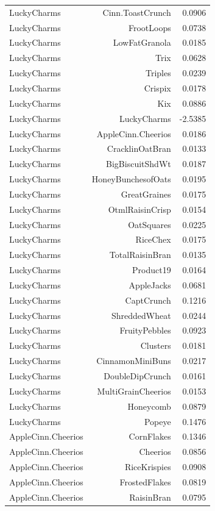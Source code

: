 \begin{longtable}{@{}lrr@{}}
LuckyCharms & Cinn.ToastCrunch & 0.0906 \\
LuckyCharms & FrootLoops & 0.0738 \\
LuckyCharms & LowFatGranola & 0.0185 \\
LuckyCharms & Trix & 0.0628 \\
LuckyCharms & Triples & 0.0239 \\
LuckyCharms & Crispix & 0.0178 \\
LuckyCharms & Kix & 0.0886 \\
LuckyCharms & LuckyCharms & -2.5385 \\
LuckyCharms & AppleCinn.Cheerios & 0.0186 \\
LuckyCharms & CracklinOatBran & 0.0133 \\
LuckyCharms & BigBiscuitShdWt & 0.0187 \\
LuckyCharms & HoneyBunchesofOats & 0.0195 \\
LuckyCharms & GreatGraines & 0.0175 \\
LuckyCharms & OtmlRaisinCrisp & 0.0154 \\
LuckyCharms & OatSquares & 0.0225 \\
LuckyCharms & RiceChex & 0.0175 \\
LuckyCharms & TotalRaisinBran & 0.0135 \\
LuckyCharms & Product19 & 0.0164 \\
LuckyCharms & AppleJacks & 0.0681 \\
LuckyCharms & CaptCrunch & 0.1216 \\
LuckyCharms & ShreddedWheat & 0.0244 \\
LuckyCharms & FruityPebbles & 0.0923 \\
LuckyCharms & Clusters & 0.0181 \\
LuckyCharms & CinnamonMiniBuns & 0.0217 \\
LuckyCharms & DoubleDipCrunch & 0.0161 \\
LuckyCharms & MultiGrainCheerios & 0.0153 \\
LuckyCharms & Honeycomb & 0.0879 \\
LuckyCharms & Popeye & 0.1476 \\
AppleCinn.Cheerios & CornFlakes & 0.1346 \\
AppleCinn.Cheerios & Cheerios & 0.0856 \\
AppleCinn.Cheerios & RiceKrispies & 0.0908 \\
AppleCinn.Cheerios & FrostedFlakes & 0.0819 \\
AppleCinn.Cheerios & RaisinBran & 0.0795 \\

\end{longtable}
